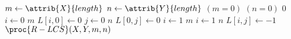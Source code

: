 \begin{codebox}
\li $m \gets \attrib{X}{length}$
\li $n \gets \attrib{Y}{length}$
\li \If $(m = 0)$ \Or $(n = 0)$
\li \Then
		\Return $0$
	\End
\li \For $i \gets 0$ \To $m$
\li \Do
		$L[i,0] \gets 0$
	\End
\li \For $j \gets 0$ \To $n$
\li \Do
		$L[0,j] \gets 0$
	\End
\li \For $i \gets 1$ \To $m$
\li \Do
		\For $i \gets 1$ \To $n$
\li 	\Do
			$L[i,j] \gets -1$
		\End
	\End
\li \Return $\proc{R-LCS}(X,Y,m,n)$
\end{codebox}